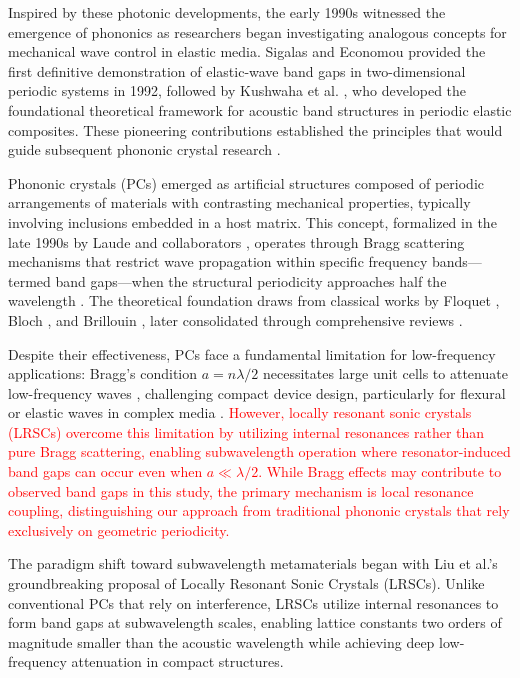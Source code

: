 \documentclass[review,numbers,sort&compress]{elsarticle}
\begin{document}
Inspired by these photonic developments, the early 1990s witnessed the emergence of phononics as researchers began investigating analogous concepts for mechanical wave control in elastic media. Sigalas and Economou \cite{Sigalas1992} provided the first definitive demonstration of elastic-wave band gaps in two-dimensional periodic systems in 1992, followed by Kushwaha et al. \cite{Kushwaha1994}, who developed the foundational theoretical framework for acoustic band structures in periodic elastic composites. These pioneering contributions established the principles that would guide subsequent phononic crystal research \cite{Vasseur1994}.


Phononic crystals (PCs) emerged as artificial structures composed of periodic arrangements of materials with contrasting mechanical properties, typically involving inclusions embedded in a host matrix. This concept, formalized in the late 1990s by Laude and collaborators \cite{Vasseur2008, Pennec2010}, operates through Bragg scattering mechanisms that restrict wave propagation within specific frequency bands---termed band gaps---when the structural periodicity approaches half the wavelength \cite{Kushwaha1994, Vasseur1994}. The theoretical foundation draws from classical works by Floquet \cite{Floquet1883}, Bloch \cite{Bloch1928}, and Brillouin \cite{Brillouin1946}, later consolidated through comprehensive reviews \cite{ElHassouani2010, Laude2015}.

Despite their effectiveness, PCs face a fundamental limitation for low-frequency applications: Bragg's condition \(a = n\lambda/2\) necessitates large unit cells to attenuate low-frequency waves \cite{Laude2015}, challenging compact device design, particularly for flexural \cite{Hussein2006} or elastic waves in complex media \cite{Zhang2014}. \textcolor{red}{However, locally resonant sonic crystals (LRSCs) overcome this limitation by utilizing internal resonances rather than pure Bragg scattering, enabling subwavelength operation where resonator-induced band gaps can occur even when $a \ll \lambda/2$. While Bragg effects may contribute to observed band gaps in this study, the primary mechanism is local resonance coupling, distinguishing our approach from traditional phononic crystals that rely exclusively on geometric periodicity.}


The paradigm shift toward subwavelength metamaterials began with Liu et al.'s \cite{Liu2000} groundbreaking proposal of Locally Resonant Sonic Crystals (LRSCs). Unlike conventional PCs that rely on interference, LRSCs utilize internal resonances to form band gaps at subwavelength scales, enabling lattice constants two orders of magnitude smaller than the acoustic wavelength while achieving deep low-frequency attenuation in compact structures.
\end{document}
